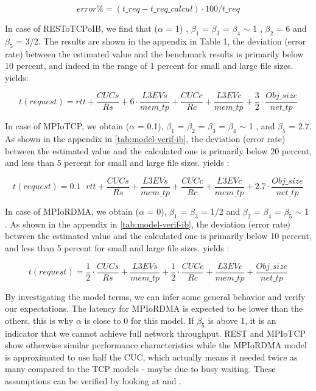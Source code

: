 \documentclass[runningheads]{llncs}
\begin{document}
\begin{equation}
 error\%=(t\_req -t\_req\_calcul)\cdot100/t\_req
\label{eq:error-rate}
\end{equation}

In case of RESToTCPoIB, we find that ($\alpha$ = 1) , $\beta_1$ = $\beta_3$ = $\beta_4$ $\sim$ 1 , $\beta_2$ = 6 and $\beta_5$ = 3/2. 
The results are shown in the appendix in Table 1, the deviation (error rate) between the estimated value and the benchmark results is primarily below 10 percent, and indeed in the range of 1 percent for small and large file sizes. yields:

\begin{equation}
\label{eq:model-rest}
t(request)=rtt+\frac{CUCs}{Rs}+6\cdot\frac{L3EVs}{mem\_tp}+\frac{CUCc}{Rc}+\frac{L3EVc}{mem\_tp}+\frac{3}{2}\cdot\frac{Obj\_size}{net\_tp}
\end{equation}

In case of MPIoTCP, we obtain ($\alpha$ = 0.1), $\beta_1$ = $\beta_2$ = $\beta_3$ = $\beta_4$ $\sim$ 1 , and $\beta_5$ = 2.7. As shown in the appendix in \cref{tab:model-verif-ib}, the deviation (error rate) between the estimated value and the calculated one is primarily below 20 percent, and less than 5 percent for small and large file sizes.
 yields :

\begin{equation}
\label{eq:model-rest}
t(request)=0.1\cdot rtt+\frac{CUCs}{Rs}+\frac{L3EVs}{mem\_tp}+\frac{CUCc}{Rc}+\frac{L3EVc}{mem\_tp}+2.7\cdot\frac{Obj\_size}{net\_tp}
\end{equation}

In case of MPIoRDMA, we obtain ($\alpha$ = 0), $\beta_1$ = $\beta_3$ = 1/2 and  $\beta_2$ = $\beta_4$ = $\beta_5$ $\sim$ 1 . As shown in the appendix in \cref{tab:model-verif-ib}, the deviation (error rate) between the estimated value and the calculated one is primarily below 10 percent, and less than 5 percent for small and large file sizes.
 yields :

\begin{equation}
\label{eq:model-rest}
t(request)=\frac{1}{2}\cdot\frac{CUCs}{Rs}+\frac{L3EVs}{mem\_tp}+\frac{1}{2}\cdot\frac{CUCc}{Rc}+\frac{L3EVc}{mem\_tp}+\frac{Obj\_size}{net\_tp}
\end{equation}

By investigating the model terms, we can infer some general behavior and verify our expectations. The latency for MPIoRDMA is expected to be lower than the others, this  is why $\alpha$ is close to 0 for this model. If $\beta_5$ is above 1, it is an indicator that we cannot achieve full network throughput. REST and MPIoTCP show otherwise similar performance characteristics while the MPIoRDMA model is approximated to use half the CUC, which actually means it needed twice as many compared to the TCP models - maybe due to busy waiting. These assumptions can be verified by looking at  and .
\end{document}
